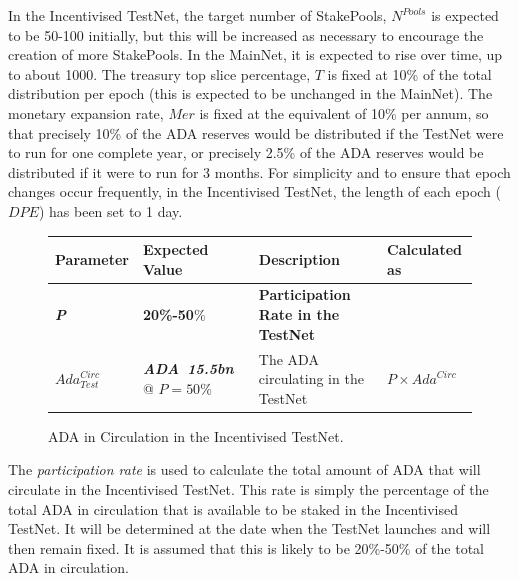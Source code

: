 \documentclass[11pt,a4paper,dvipsnames,twosided,final]{article}
\newcommand{\ada}{ADA{}}
\newcommand{\ADA}[1]{\textbf{\emph{\ada~{#1}}}}
\begin{document}
\noindent
In the Incentivised TestNet,
the target number of StakePools, $N^{\textit{Pools}}$ is expected to be 50-100 initially, but this will be increased as necessary to encourage the creation of more StakePools.
In the MainNet, it is expected to rise over time, up to about 1000.
The treasury top slice percentage, $T$ is fixed at 10\% of the total distribution per epoch (this is expected to be unchanged in the MainNet).
The monetary expansion rate, $\textit{Mer}$ is fixed at the equivalent of 10\% per annum, so that precisely 10\% of the \ada{} reserves would be distributed
if the TestNet were to run for one complete year, or precisely 2.5\% of the \ada{} reserves would be distributed if it were to run for 3 months.
For simplicity and to ensure that epoch changes occur frequently, in the Incentivised TestNet, the length of each epoch ($\textit{DPE}$) has been set to 1 day.

\begin{figure}[h!]
\begin{center}
\begin{tabular}{||l|l|p{6cm}|l||}
  \hline \hline
\textbf{Parameter} & \textbf{Expected Value} & \textbf{Description} & \textbf{Calculated as} \\\hline
\textbf{\color{blue} \emph{P}} & \textbf{\color{blue} 20\%-50}\% & \textbf{\color{blue} Participation Rate in the TestNet} & \\\hline
$\textit{Ada}^{\textit{Circ}}_{\textit{Test}}$ & \ADA{15.5bn} @ $P=50\%$ & The \ada{} circulating in the TestNet & $P \times \textit{Ada}^{\textit{Circ}}$ \\\hline
  \hline
\end{tabular}
\end{center}
\caption{\ada{} in Circulation in the Incentivised TestNet.}
\end{figure}

\noindent
The \emph{participation rate} is used to calculate the total amount of \ada{} that will circulate in the Incentivised TestNet.
This rate is simply the percentage of the total \ada{} in  circulation that is available to be staked in the Incentivised TestNet.
It will be determined at the date when the
TestNet launches and will then remain fixed.
It is assumed that this is likely to be 20\%-50\% of the total \ada{} in circulation.
\end{document}
